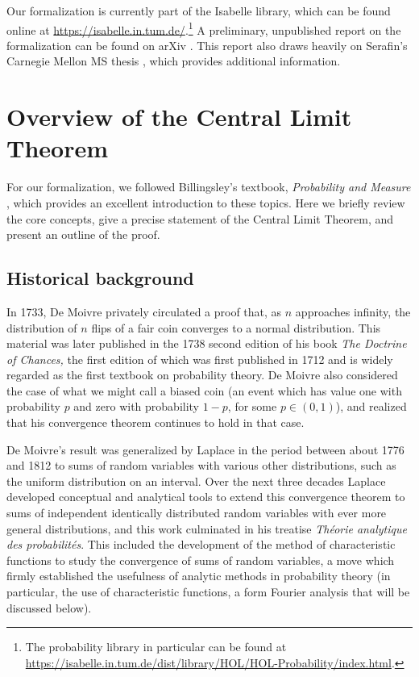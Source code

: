 \documentclass{svjour3}
\begin{document}
Our formalization is currently part of the Isabelle library, which can be found online at \url{https://isabelle.in.tum.de/}.\footnote{The probability library in particular can be found at \url{https://isabelle.in.tum.de/dist/library/HOL/HOL-Probability/index.html}.} A preliminary, unpublished report on the formalization can be found on arXiv \cite{avigad:hoelzl:serafin:14}. This report also draws heavily on Serafin's Carnegie Mellon MS thesis \cite{serafin:15}, which provides additional information.

\section{Overview of the Central Limit Theorem}
\label{section:overview}

For our formalization, we followed Billingsley's textbook, \emph{Probability and Measure} \cite{billingsley:95}, which provides an excellent introduction to these topics. Here we briefly review the core concepts, give a precise statement of the Central Limit Theorem, and present an outline of the proof.

\subsection{Historical background}
\label{subsection:historical}

In 1733, De Moivre privately circulated a proof that, as $n$ approaches infinity, the distribution of $n$ flips of a fair coin converges to a normal distribution. This material was later published in the 1738 second edition of his book {\em The Doctrine of Chances,} the first edition of which was first published in 1712 and is widely regarded as the first textbook on probability theory. De Moivre also considered the case of what we might call a biased coin (an event which has value one with probability $p$ and zero with probability $1-p$, for some $p \in (0,1)$), and realized that his convergence theorem continues to hold in that case.

De Moivre's result was generalized by Laplace in the period between about 1776 and 1812 to sums of random variables with various other distributions, such as the uniform distribution on an interval. Over the next three decades Laplace developed conceptual and analytical tools to extend this convergence theorem to sums of independent identically distributed random variables with ever more general distributions, and this work culminated in his treatise {\em Th\'eorie analytique des probabilit\'es}. This included the development of the method of characteristic functions to study the convergence of sums of random variables, a move which firmly established the usefulness of analytic methods in probability theory (in particular, the use of characteristic functions, a form Fourier analysis that will be discussed below). 
\end{document}
